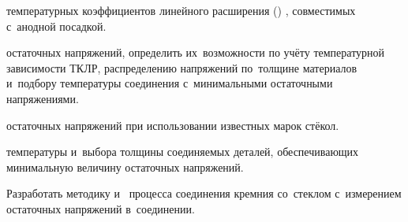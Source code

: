 \item \label{task1} температурных коэффициентов линейного расширения
() , совместимых с~анодной посадкой.
\item \label{task2} остаточных напряжений, определить
их~возможности по учёту температурной зависимости ТКЛР, распределению
напряжений по~толщине материалов и~подбору температуры соединения
с~минимальными остаточными напряжениями.
\item \label{task3} остаточных напряжений
при использовании известных марок стёкол.
\item \label{task4} температуры
и~выбора толщины соединяемых деталей, обеспечивающих
минимальную величину остаточных напряжений.
\item \label{task5}Разработать методику и~ процесса соединения кремния со~стеклом с~измерением
остаточных напряжений в~соединении.
